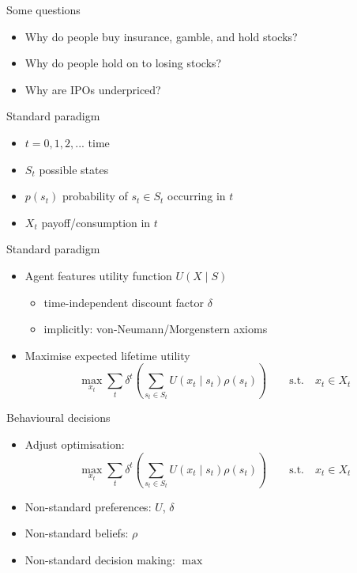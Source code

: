 \begin{frame}{Some questions}
    \begin{itemize}
        \item Why do people buy insurance, gamble, and hold stocks?\bigskip
        \item Why do people hold on to losing stocks?\bigskip
        \item Why are IPOs underpriced?\bigskip
    \end{itemize}
\end{frame}

\begin{frame}{Standard paradigm}
    \begin{itemize}
        \item $t= 0,1,2,...$ time\bigskip
        \item $S_t$ possible states\bigskip
        \item $p(s_t)$ probability of $s_t \in S_t$ occurring in $t$\bigskip
        \item $X_t$ payoff/consumption in $t$\bigskip
    \end{itemize}
\end{frame}

\begin{frame}{Standard paradigm}
\begin{itemize}
    \item Agent features utility function $U(X\mid S)$\medskip
    \begin{itemize}
\item time-independent discount factor $\delta $\medskip
\item implicitly: von-Neumann/Morgenstern axioms\medskip
\end{itemize}\bigskip

    \item Maximise expected lifetime utility\medskip
	\[\max_{x_t} \sum_t  \delta^t \left(\sum_{s_t \in S_t} U(x_t \mid s_t)\rho (s_t) \right) \qquad \text{s.t.} \quad x_t \in X_t\]
   \end{itemize}
\end{frame}


\begin{frame}{Behavioural decisions}
\begin{itemize}
\item Adjust optimisation:
	\[\max_{x_t} \sum_t  \delta^t \left(\sum_{s_t \in S_t} U(x_t \mid s_t)\rho (s_t) \right) \qquad \text{s.t.} \quad x_t \in X_t\]\bigskip
        \item Non-standard preferences: $U$, $\delta $\bigskip
        \item Non-standard beliefs: $\rho$\bigskip
        \item Non-standard decision making: $\max$\bigskip
\end{itemize}
\end{frame}


